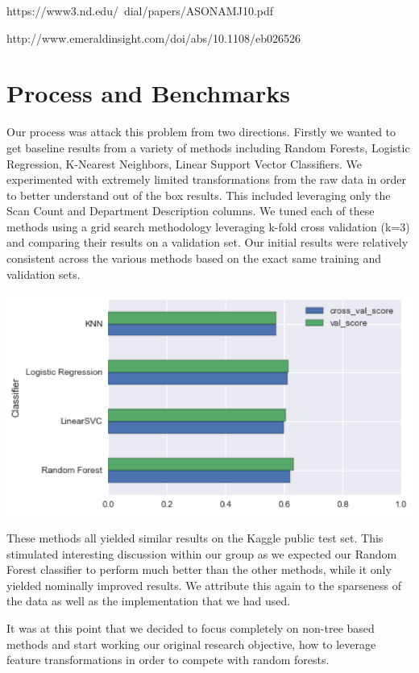 \documentclass{article} %
\begin{document}
https://www3.nd.edu/~dial/papers/ASONAMJ10.pdf

http://www.emeraldinsight.com/doi/abs/10.1108/eb026526



\section{Process and Benchmarks}
\label{headings}

Our process was attack this problem from two directions. Firstly we wanted to get baseline results from a variety of methods including Random Forests, Logistic Regression, K-Nearest Neighbors, Linear Support Vector Classifiers. We experimented with extremely limited transformations from the raw data in order to better understand out of the box results. This included leveraging only the Scan Count and Department Description columns. We tuned each of these methods using a grid search methodology leveraging k-fold cross validation (k=3) and comparing their results on a validation set. Our initial results were relatively consistent across the various methods based on the exact same training and validation sets.

\includegraphics[scale=0.4]{comparison_baseline.png} 

These methods all yielded similar results on the Kaggle public test set. This stimulated interesting discussion within our group as we expected our Random Forest classifier to perform much better than the other methods, while it only yielded nominally improved results. We attribute this again to the sparseness of the data as well as the implementation that we had used.

It was at this point that we decided to focus completely on non-tree based methods and start working our original research objective, how to leverage feature transformations in order to compete with random forests.
\end{document}
